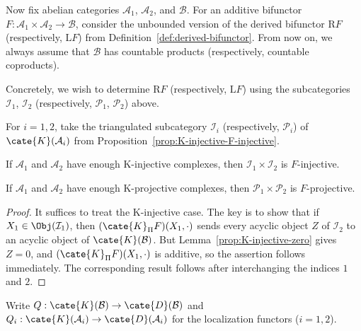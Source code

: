 Now fix abelian categories $\mathcal{A}_1$, $\mathcal{A}_2$, and
$\mathcal{B}$. For an additive bifunctor
$F:\mathcal{A}_1\times\mathcal{A}_2\to\mathcal{B}$, consider the unbounded
version of the derived bifunctor $\mathrm{R}F$ (respectively,
$\mathrm{L}F$) from Definition~\ref{def:derived-bifunctor}. From now on, we
always assume that $\mathcal{B}$ has countable products (respectively,
countable coproducts).

Concretely, we wish to determine $\mathrm{R}F$ (respectively,
$\mathrm{L}F$) using the subcategories $\mathcal{I}_1$, $\mathcal{I}_2$
(respectively, $\mathcal{P}_1$, $\mathcal{P}_2$) above.

\begin{lemma}\label{prop:bifunctor-via-K-injective-prep}
	For $i=1,2$, take the triangulated subcategory $\mathcal{I}_i$
	(respectively, $\mathcal{P}_i$) of $\cate{K}(\mathcal{A}_i)$ from
	Proposition~\ref{prop:K-injective-F-injective}.
	\begin{compactitem}
		\item If $\mathcal{A}_1$ and $\mathcal{A}_2$ have enough K-injective
		complexes, then $\mathcal{I}_1\times\mathcal{I}_2$ is $F$-injective.
		\item If $\mathcal{A}_1$ and $\mathcal{A}_2$ have enough K-projective
		complexes, then $\mathcal{P}_1\times\mathcal{P}_2$ is $F$-projective.
	\end{compactitem}
\end{lemma}
\begin{proof}
	It suffices to treat the K-injective case. The key is to show that if
	$X_1\in\Obj(\mathcal{I}_1)$, then
	$(\cate{K}_{\Pi}F)(X_1,\cdot)$ sends every acyclic object $Z$ of
	$\mathcal{I}_2$ to an acyclic object of $\cate{K}(\mathcal{B})$. But
	Lemma~\ref{prop:K-injective-zero} gives $Z=0$, and
	$(\cate{K}_{\Pi}F)(X_1,\cdot)$ is additive, so the assertion follows
	immediately. The corresponding result follows after interchanging the
	indices $1$ and $2$.
\end{proof}

Write $Q:\cate{K}(\mathcal{B})\to\cate{D}(\mathcal{B})$ and
$Q_i:\cate{K}(\mathcal{A}_i)\to\cate{D}(\mathcal{A}_i)$ for the
localization functors ($i=1,2$).

